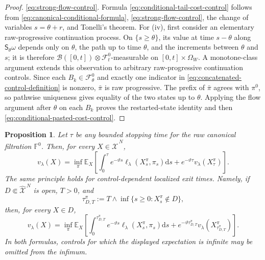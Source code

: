 \documentclass[11pt]{article}
\def\E{\mathbb{E}}
\def\Fc{{\mathcal F}}
\def\Xc{{\mathcal X}}
\def\hX{\widehat{\Xc}^{\,N}}
\newcommand{\dd}{\mathrm{d}}
\newtheorem{proposition}[theorem]{Proposition}
\theoremstyle{definition}
\theoremstyle{remark}
\numberwithin{equation}{section}
\begin{document}
\begin{proof}
\eqref{eq:strong-flow-control}.  Formula \eqref{eq:conditional-tail-cost-control} follows from
\eqref{eq:canonical-conditional-formula}, \eqref{eq:strong-flow-control}, the change of variables
$s=\theta+r$, and Tonelli's theorem.
For (iv), first consider an elementary raw-progressive continuation process.  On
$\{s\ge\theta\}$, its value at time $s-\theta$ along $\mathsf S_\theta\omega$ depends only on
$\theta$, the path up to time $\theta$, and the increments between $\theta$ and $s$; it is therefore
$\mathcal B([0,t])\otimes\Fc_t^0$-measurable on $[0,t]\times\Omega_W$.  A monotone-class
argument extends this observation to arbitrary raw-progressive continuation controls.  Since each
$B_k\in\Fc_\theta^0$ and exactly one indicator in
\eqref{eq:concatenated-control-definition} is nonzero, $\bar\pi$ is raw progressive.  The prefix of
$\bar\pi$ agrees with $\pi^0$, so pathwise uniqueness gives equality of the two states up to
$\theta$.  Applying the flow argument after $\theta$ on each $B_k$ proves the restarted-state
identity and then \eqref{eq:conditional-pasted-cost-control}.
\end{proof}
\begin{proposition}\label{prop:DPP}
Let $\tau$ be any bounded stopping time for the raw canonical filtration $\mathbb F^0$.  Then, for
every $X\in\hX$,
\begin{equation}\label{eq:DPP-HJB-detailed}
 v_\lambda(X)=\inf_\pi\E_X\left[
 \int_0^\tau e^{-\vartheta s}\ell_\lambda(X_s^\pi,\pi_s)\dd s
 +e^{-\vartheta\tau}v_\lambda(X_\tau^\pi)\right].
\end{equation}
The same principle holds for control-dependent localized exit times.  Namely, if
$D\Subset\hX$ is open, $T>0$, and
\begin{equation}\label{eq:localized-stopping-time-DPP}
 \tau_{D,T}^\pi
 :=T\wedge\inf\{s\ge0:X_s^\pi\notin D\},
\end{equation}
then, for every $X\in D$,
\begin{equation}\label{eq:DPP-stopping-control}
 v_\lambda(X)=\inf_\pi\E_X\left[
 \int_0^{\tau_{D,T}^\pi}e^{-\vartheta s}
 \ell_\lambda(X_s^\pi,\pi_s)\dd s
 +e^{-\vartheta\tau_{D,T}^\pi}
 v_\lambda(X_{\tau_{D,T}^\pi}^\pi)\right].
\end{equation}
In both formulas, controls for which the displayed expectation is infinite may be omitted from the
infimum.
\end{proposition}
\end{document}
